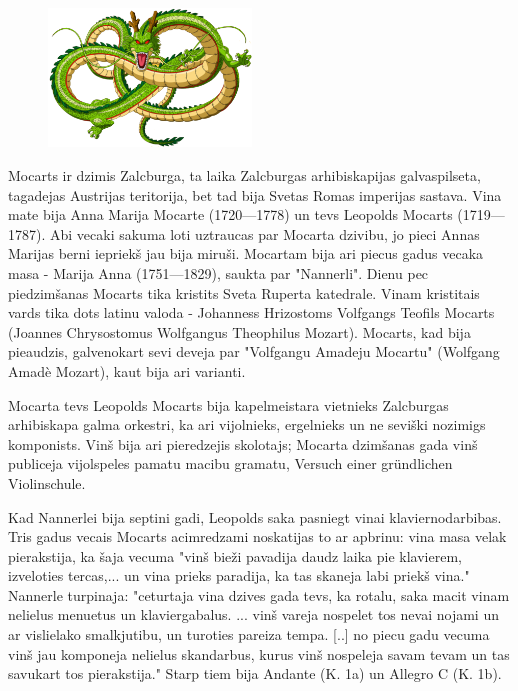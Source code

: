 \documentclass[a4paper]{article}
\begin{document}
\raggedright 
\begin{figure}
	\includegraphics[width=0.48\textwidth]{shenron.png}
\end{figure}
Mocarts ir dzimis Zalcburga, ta laika Zalcburgas arhibiskapijas galvaspilseta, tagadejas Austrijas teritorija, bet tad bija Svetas Romas imperijas sastava. Vina mate bija Anna Marija Mocarte (1720—1778) un tevs Leopolds Mocarts (1719—1787). Abi vecaki sakuma loti uztraucas par Mocarta dzivibu, jo pieci Annas Marijas berni iepriekš jau bija miruši. Mocartam bija ari piecus gadus vecaka masa - Marija Anna (1751—1829), saukta par "Nannerli". Dienu pec piedzimšanas Mocarts tika kristits Sveta Ruperta katedrale. Vinam kristitais vards tika dots latinu valoda - Johanness Hrizostoms Volfgangs Teofils Mocarts (Joannes Chrysostomus Wolfgangus Theophilus Mozart). Mocarts, kad bija pieaudzis, galvenokart sevi deveja par "Volfgangu Amadeju Mocartu" (Wolfgang Amadè Mozart), kaut bija ari varianti.

Mocarta tevs Leopolds Mocarts bija kapelmeistara vietnieks Zalcburgas arhibiskapa galma orkestri, ka ari vijolnieks, ergelnieks un ne seviški nozimigs komponists. Vinš bija ari pieredzejis skolotajs; Mocarta dzimšanas gada vinš publiceja vijolspeles pamatu macibu gramatu, Versuch einer gründlichen Violinschule.

Kad Nannerlei bija septini gadi, Leopolds saka pasniegt vinai klaviernodarbibas. Tris gadus vecais Mocarts acimredzami noskatijas to ar apbrinu: vina masa velak pierakstija, ka šaja vecuma "vinš bieži pavadija daudz laika pie klavierem, izveloties tercas,... un vina prieks paradija, ka tas skaneja labi priekš vina." Nannerle turpinaja: "ceturtaja vina dzives gada tevs, ka rotalu, saka macit vinam nelielus menuetus un klaviergabalus. ... vinš vareja nospelet tos nevai nojami un ar vislielako smalkjutibu, un turoties pareiza tempa. [..] no piecu gadu vecuma vinš jau komponeja nelielus skandarbus, kurus vinš nospeleja savam tevam un tas savukart tos pierakstija." Starp tiem bija Andante (K. 1a) un Allegro C (K. 1b).
\end{document}
